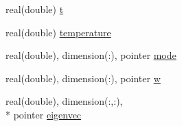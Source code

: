 \begin{DoxyCompactItemize}
\item 
real(double) \hyperlink{structhb__class_1_1hb_aa9a64f5f6e1c6b43e49f4f369cc36122}{t}
\item 
real(double) \hyperlink{structhb__class_1_1hb_a5d5e5ee121dffd96571df21b84b83507}{temperature}
\item 
real(double), dimension(\+:), pointer \hyperlink{structhb__class_1_1hb_ac5b121a046f5ee32acc9830d4a9d0583}{mode}
\item 
real(double), dimension(\+:), pointer \hyperlink{structhb__class_1_1hb_aa5b032073db26bbc82430e5dcefa77a6}{w}
\item 
real(double), dimension(\+:,\+:), \\*
pointer \hyperlink{structhb__class_1_1hb_ac62b62b36a6c37ba8477efc35c6f97bf}{eigenvec}
\end{DoxyCompactItemize}


